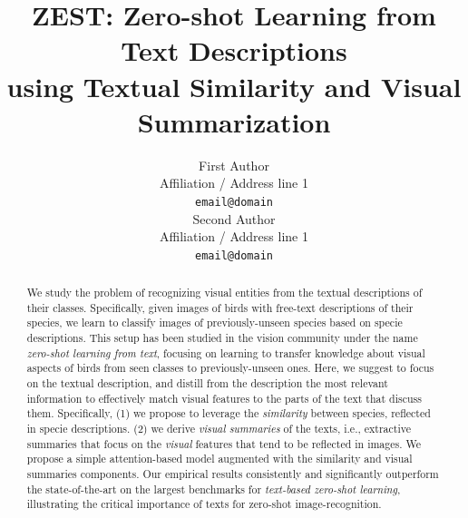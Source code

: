 \documentclass[11pt,a4paper]{article}
\title{ZEST: Zero-shot Learning from Text Descriptions\\ %
using Textual Similarity and Visual Summarization}
\author{First Author \\
 Affiliation / Address line 1 \\
 \texttt{email@domain} \\\And
 Second Author \\
 Affiliation / Address line 1 \\
 \texttt{email@domain} \\}
\date{}
\begin{document}
\maketitle


\begin{abstract}



We study the problem of recognizing visual entities from the textual descriptions of their classes. Specifically, given images of birds with free-text descriptions of their species, we learn to classify images of previously-unseen species based on specie descriptions. This setup has been studied in the vision community under the name {\em zero-shot learning from text}, focusing on learning to transfer knowledge about visual aspects of birds from seen classes to previously-unseen ones. Here, we suggest to focus on the textual description, 
%
and distill from the description the most relevant information to effectively match visual features to the parts of the text that discuss them. 
Specifically, %
(1) we propose to leverage the {\em similarity} between species, reflected in specie descriptions. 
(2) we derive {\em visual summaries} of the texts, i.e., %
extractive summaries that focus on the {\em visual} features that tend to be reflected in images.
We propose a simple attention-based model augmented with  the similarity and visual summaries components. Our empirical results consistently and significantly outperform the state-of-the-art on the largest benchmarks for {\em text-based zero-shot learning}, illustrating the critical importance of texts for zero-shot image-recognition.




\end{abstract}
\end{document}
